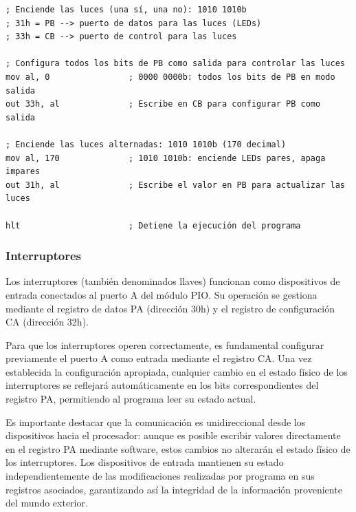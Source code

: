 \documentclass[12pt,oneside]{templates/unerthesis}
\begin{document}
\begin{lstlisting}
; Enciende las luces (una sí, una no): 1010 1010b
; 31h = PB --> puerto de datos para las luces (LEDs)
; 33h = CB --> puerto de control para las luces

; Configura todos los bits de PB como salida para controlar las luces
mov al, 0                ; 0000 0000b: todos los bits de PB en modo salida
out 33h, al              ; Escribe en CB para configurar PB como salida

; Enciende las luces alternadas: 1010 1010b (170 decimal)
mov al, 170              ; 1010 1010b: enciende LEDs pares, apaga impares
out 31h, al              ; Escribe el valor en PB para actualizar las luces

hlt                      ; Detiene la ejecución del programa\end{lstlisting}

\hypertarget{interruptores}{%
\subsubsection{Interruptores}\label{interruptores}}

Los interruptores (también denominados llaves) funcionan como dispositivos de entrada conectados al puerto A del módulo PIO. Su operación se gestiona mediante el registro de datos PA (dirección 30h) y el registro de configuración CA (dirección 32h).

Para que los interruptores operen correctamente, es fundamental configurar previamente el puerto A como entrada mediante el registro CA. Una vez establecida la configuración apropiada, cualquier cambio en el estado físico de los interruptores se reflejará automáticamente en los bits correspondientes del registro PA, permitiendo al programa leer su estado actual.

Es importante destacar que la comunicación es unidireccional desde los dispositivos hacia el procesador: aunque es posible escribir valores directamente en el registro PA mediante software, estos cambios no alterarán el estado físico de los interruptores. Los dispositivos de entrada mantienen su estado independientemente de las modificaciones realizadas por programa en sus registros asociados, garantizando así la integridad de la información proveniente del mundo exterior.
\end{document}
